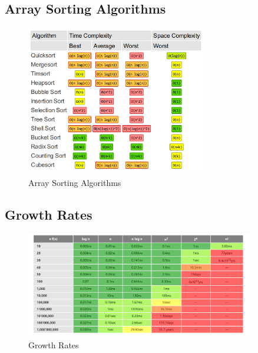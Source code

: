 \subsection{Array Sorting Algorithms}
\begin{figure}[H] %
\centering %
\includegraphics[width=0.7\textwidth]{images_content/2.png} %
\caption{Array Sorting Algorithms} %
\end{figure}

\subsection{Growth Rates}
\begin{figure}[H] %
\centering %
\includegraphics[width=0.9\textwidth]{images_content/3.png} %
\caption{Growth Rates} %
\end{figure}


